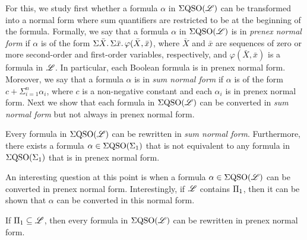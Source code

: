 For this, we study first whether a formula $\alpha$ in $\Sigma{\rm QSO}(\mathscr{L})$ can be transformed into a 
normal form where sum quantifiers are restricted to be at the beginning of the formula. 
Formally, we say that a formula $\alpha$ in $\Sigma{\rm QSO}(\mathscr{L})$ is in \emph{prenex normal form} 
if $\alpha$ is of the form
$\Sigma{\bar{X}}.\, \Sigma{\bar{x}}.\, \varphi(\bar{X}, \bar{x})$,
where $\bar{X}$ and $\bar{x}$ are sequences of zero or more second-order and first-order variables, respectively, and $\varphi(\bar{X}, \bar{x})$ is a formula in $\mathscr{L}$.
In particular, 
each Boolean formula is in 
prenex normal form.
Moreover, we say that a formula $\alpha$ is in \emph{sum normal form} if $\alpha$ is of the form $c + \Sigma_{i=1}^n \alpha_i$, where $c$ is a non-negative constant and each $\alpha_i$ is in 
prenex normal form.
Next we show that each formula in $\Sigma{\rm QSO}(\mathscr{L})$ can be converted in \emph{sum normal form} but not always in prenex normal form.
\begin{theorem}\label{theo-pnf-snf}
Every formula in $\Sigma{\rm QSO}(\mathscr{L})$ can be rewritten in \emph{sum normal form}. Furthermore, there exists a formula $\alpha \in \Sigma{\rm QSO}(\Sigma_{1})$ that is not equivalent to any formula in $\Sigma{\rm QSO}(\Sigma_{1})$ that is in prenex normal form.
\end{theorem}

An interesting question at this point is when a formula $\alpha \in \Sigma{\rm QSO}(\mathscr{L})$ can be converted in 
prenex normal form. 
Interestingly, if $\mathscr{L}$ contains $\Pi_{1}$, then it can be shown that $\alpha$ can be converted in
this normal form. 
\begin{theorem}\label{theo-pi1-pnf}
	If $\Pi_{1} \subseteq \mathscr{L}$, then 
	every formula in
	$\Sigma{\rm QSO}(\mathscr{L})$ can be rewritten in 
	prenex normal form.
\end{theorem}

